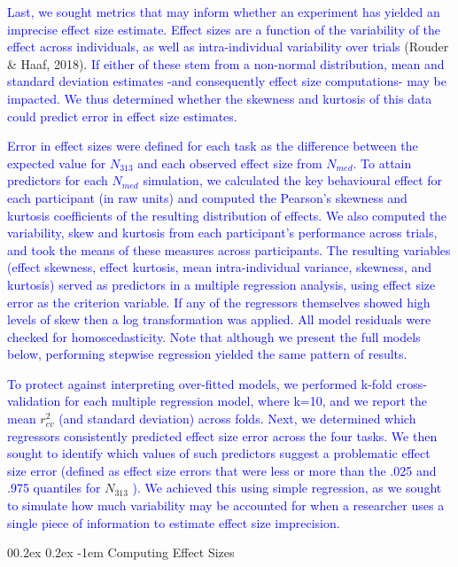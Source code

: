 \documentclass[
  man]{apa6}
\makeatletter
\let\oldparagraph\paragraph
\renewcommand{\paragraph}[1]{\oldparagraph{#1}\mbox{}}
\renewcommand{\paragraph}{\@startsection{paragraph}{4}{\parindent}%
  {0\baselineskip \@plus 0.2ex \@minus 0.2ex}%
  {-1em}%
  {\normalfont\normalsize\bfseries\itshape\typesectitle}}
\makeatother
\begin{document}
\textcolor{blue}{Last, we sought metrics that may inform whether an experiment has yielded an imprecise effect size estimate. Effect sizes are a function of the variability of the effect across individuals, as well as intra-individual variability over trials} (Rouder \& Haaf, 2018). \textcolor{blue}{If either of these stem from a non-normal distribution, mean and standard deviation estimates -and consequently effect size computations- may be impacted. We thus determined whether the skewness and kurtosis of this data could predict error in effect size estimates.}

\textcolor{blue}{Error in effect sizes were defined for each task as the difference between the expected value for $N_{313}$ and each observed effect size from $N_{med}$. To attain predictors for each $N_{med}$ simulation, we calculated the key behavioural effect for each participant (in raw units) and computed the Pearson's skewness and kurtosis coefficients of the resulting distribution of effects. We also computed the variability, skew and kurtosis from each participant's performance across trials, and took the means of these measures across participants. The resulting variables (effect skewness, effect kurtosis, mean intra-individual variance, skewness, and kurtosis) served as predictors in a multiple regression analysis, using effect size error as the criterion variable. If any of the regressors themselves showed high levels of skew then a log transformation was applied. All model residuals were checked for homoscedasticity. Note that although we present the full models below, performing stepwise regression yielded the same pattern of results.}

\textcolor{blue}{To protect against interpreting over-fitted models, we performed k-fold cross-validation for each multiple regression model, where k=10, and we report the mean} \(r_{cv}^2\) \textcolor{blue}{ (and standard deviation) across folds. Next, we determined which regressors consistently predicted effect size error across the four tasks. We then sought to identify which values of such predictors suggest a problematic effect size error (defined as effect size errors that were less or more than the .025 and .975 quantiles for} \(N_{313}\) \textcolor{blue}{). We achieved this using simple regression, as we sought to simulate how much variability may be accounted for when a researcher uses a single piece of information to estimate effect size imprecision.}

\hypertarget{computing-effect-sizes}{%
\paragraph{Computing Effect Sizes}\label{computing-effect-sizes}}
\end{document}
